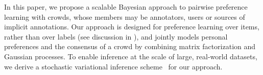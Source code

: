 In this paper, we propose a scalable Bayesian approach to pairwise preference learning with crowds,
whose members may be annotators, users or sources of implicit annotations.
Our approach is designed for preference learning over items, rather than over labels (see discussion in \citet{furnkranz2010preference}),
and jointly models %
personal preferences and the consensus of a crowd by combining 
matrix factorization and Gaussian processes. %
To enable inference at the scale of large, real-world datasets,
we derive a stochastic variational inference scheme~\citep{hoffman2013stochastic} for our approach.
